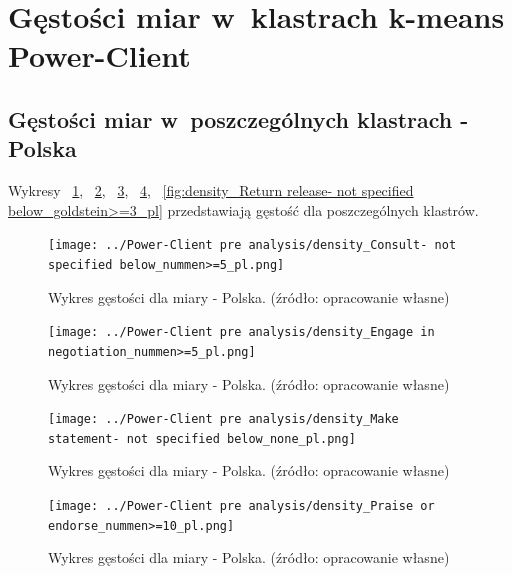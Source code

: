 \documentclass[11pt]{report}
\begin{document}
    \section{Gęstości miar w~klastrach k-means Power-Client}

    \subsection{Gęstości miar w~poszczególnych klastrach - Polska}\label{subsec:gęstośc-miar-w-poszczególnych-klastrach---polska}
    Wykresy
    ~\ref{fig:density_Consult- not specified below_nummen>=5_pl},
    ~\ref{fig:density_Engage in negotiation_nummen>=5_pl},
    ~\ref{fig:density_Make statement- not specified below_none_pl},
    ~\ref{fig:density_Praise or endorse_nummen>=10_pl},
    ~\ref{fig:density_Return release- not specified below_goldstein>=3_pl}
    przedstawiają gęstość dla poszczególnych klastrów.

    \begin{figure}[tp]
        \centering
        \texttt{[image: ../Power-Client pre analysis/density\_Consult- not specified below\_nummen>=5\_pl.png]}
        \caption{Wykres gęstości dla miary - Polska. (źródło: opracowanie własne)}
        \label{fig:density_Consult- not specified below_nummen>=5_pl}
    \end{figure}

    \begin{figure}[tp]
        \centering
        \texttt{[image: ../Power-Client pre analysis/density\_Engage in negotiation\_nummen>=5\_pl.png]}
        \caption{Wykres gęstości dla miary - Polska. (źródło: opracowanie własne)}
        \label{fig:density_Engage in negotiation_nummen>=5_pl}
    \end{figure}

    \begin{figure}[tp]
        \centering
        \texttt{[image: ../Power-Client pre analysis/density\_Make statement- not specified below\_none\_pl.png]}
        \caption{Wykres gęstości dla miary - Polska. (źródło: opracowanie własne)}
        \label{fig:density_Make statement- not specified below_none_pl}
    \end{figure}

    \begin{figure}[tp]
        \centering
        \texttt{[image: ../Power-Client pre analysis/density\_Praise or endorse\_nummen>=10\_pl.png]}
        \caption{Wykres gęstości dla miary - Polska. (źródło: opracowanie własne)}
        \label{fig:density_Praise or endorse_nummen>=10_pl}
    \end{figure}
\end{document}
